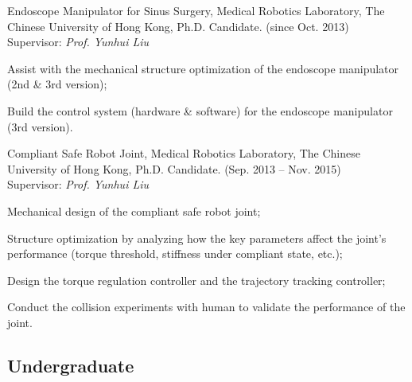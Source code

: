 \documentclass[10pt,letterpaper]{article}
\renewenvironment{itemize}{
  \begin{list}{}{
    \setlength{\leftmargin}{1.5em}
    \setlength{\itemsep}{0.25em}
    \setlength{\parskip}{0pt}
    \setlength{\parsep}{0.25em}
  }
}{
  \end{list}
}
\begin{document}
\begin{itemize}
\item Endoscope Manipulator for Sinus Surgery, Medical Robotics Laboratory, The Chinese University of Hong Kong, Ph.D. Candidate. (since Oct. 2013) \\
  Supervisor: \textit{Prof. Yunhui Liu}
  \begin{itemize}
  \item Assist with the mechanical structure optimization of the endoscope manipulator (2nd \& 3rd version);
  \item Build the control system (hardware \& software) for the endoscope manipulator (3rd version).
  \end{itemize}

\item Compliant Safe Robot Joint, Medical Robotics Laboratory, The Chinese University of Hong Kong, Ph.D. Candidate. (Sep. 2013 -- Nov. 2015) \\
  Supervisor: \textit{Prof. Yunhui Liu}
  \begin{itemize}
  \item Mechanical design of the compliant safe robot joint;
  \item Structure optimization by analyzing how the key parameters affect the joint's performance (torque threshold, stiffness under compliant state, etc.);
  \item Design the torque regulation controller and the trajectory tracking controller;
  \item Conduct the collision experiments with human to validate the performance of the joint.
  \end{itemize}
\end{itemize}

\subsection*{Undergraduate}
\end{document}
